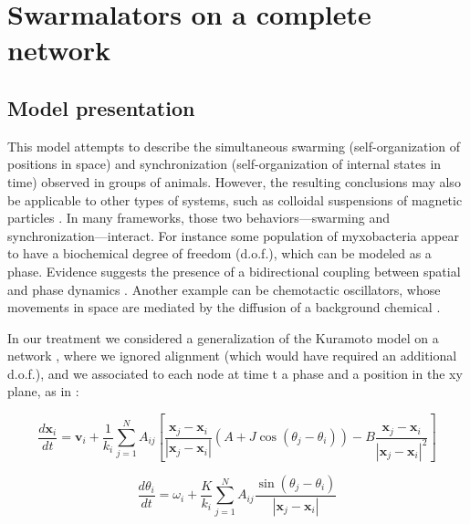 \chapter{Swarmalators on a complete network}

\section{Model presentation}

This model attempts to describe the simultaneous swarming (self-organization of positions in space) and synchronization (self-organization of internal states in time) observed in groups of animals. However, the resulting conclusions may also be applicable to other types of systems, such as colloidal suspensions of magnetic particles \cite{osti_1344461,Snezhko2011MagneticMO,Yan2012LinkingST}. In many frameworks, those two behaviors—swarming and synchronization—interact. For instance some population of myxobacteria appear to have a biochemical degree of freedom (d.o.f.), which can be modeled as a phase. Evidence suggests the presence of a bidirectional coupling between spatial and phase dynamics \cite{igoshin2001pattern}. Another example can be chemotactic oscillators, whose movements in space are mediated by the diffusion of a background chemical \cite{iwasa2010hierarchical,tanaka2007general}.


In our treatment we considered a generalization of the Kuramoto model \cite{Acebron_2005} on a network \cite{Rodrigues_2016}, where we ignored alignment (which would have required an additional d.o.f.), and we associated to each node at time t a phase and a position in the xy plane, as in \cite{O_Keeffe_2017, Sar_2022}:

\begin{equation}
\label{r_swarm}
\frac{d\mathbf{x}_i}{dt} = \mathbf{v}_i + \frac{1}{k_i} \sum_{j=1}^{N} A_{ij}\left[ \frac{\mathbf{x}_j - \mathbf{x}_i}{|\mathbf{x}_j - \mathbf{x}_i|} \left(A + J \cos(\theta_j - \theta_i)\right) - B\frac{\mathbf{x}_j -  \mathbf{x}_i}{|\mathbf{x}_j - \mathbf{x}_i|^2} \right]
\end{equation}



\begin{equation}
\label{theta_swarm}
\frac{d\theta_i}{dt} = \omega_i + \frac{K}{k_i} \sum_{j= 1}^{N} A_{ij} \frac{\sin(\theta_j - \theta_i)}{|\mathbf{x}_j - \mathbf{x}_i|}
\end{equation}


